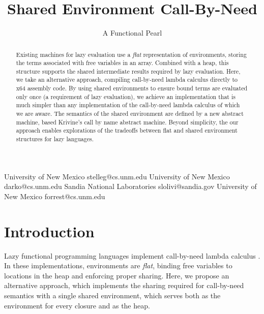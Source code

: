 \documentclass[preprint]{sigplanconf}
\begin{document}
\title{Shared Environment Call-By-Need}
\subtitle{A Functional Pearl}

           {University of New Mexico}
           {stelleg@cs.unm.edu}
           {University of New Mexico}
           {darko@cs.unm.edu}
           {Sandia National Laboratories}
           {slolivi@sandia.gov}
           {University of New Mexico}
           {forrest@cs.unm.edu}

\maketitle

\begin{abstract}
  Existing machines for lazy evaluation use a \emph{flat}
  representation of environments, storing the terms associated with
  free variables in an array.  Combined with a heap, this structure
  supports the shared intermediate results required by lazy
  evaluation.  Here, we take an alternative approach, compiling
  call-by-need lambda calculus directly to x64 assembly code.  By
  using shared environments to ensure bound terms are evaluated only
  once (a requirement of lazy evaluation), we achieve an
  implementation that is much simpler than any implementation of the
  call-by-need lambda calculus of which we are aware.  The semantics
  of the shared environment are defined by a new abstract machine, based
  Krivine's call by name abstract machine.  Beyond simplicity, the
  our approach enables explorations of the tradeoffs between flat and
  shared environment structures for lazy languages.

\end{abstract}

\section{Introduction} \label{sec:intro}

Lazy functional programming languages implement call-by-need lambda calculus
\cite{ariola1995call}. In these implementations, environments are \emph{flat},
binding free variables to locations in the heap and enforcing proper sharing.
Here, we propose an alternative approach, which implements the sharing required
for call-by-need semantics with a single shared environment, which serves both
as the environment for every closure and as the heap. 
\end{document}

